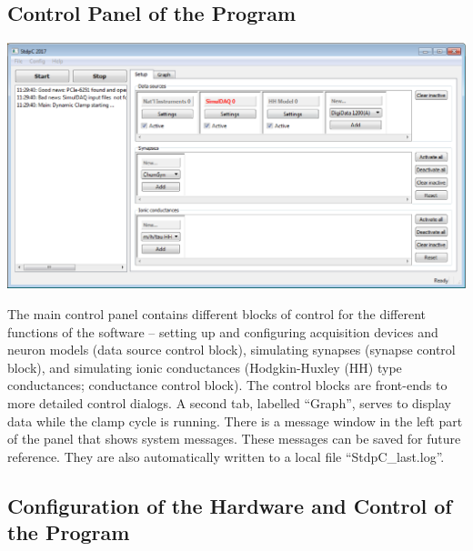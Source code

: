\documentclass{article}
\begin{document}
 
\subsection{Control Panel of the Program}

\parbox{\textwidth}{
  \includegraphics[width=\textwidth]{main}
}
\vspace*{0.5cm}

The main control panel contains different blocks of control for the
different functions of the software -- setting up and configuring acquisition
devices and neuron models (data source control block), simulating synapses
(synapse control block), and simulating ionic conductances (Hodgkin-Huxley (HH)
type conductances; conductance control block). The control blocks are front-ends to
more detailed control dialogs. A second tab, labelled ``Graph'', serves
to display data while the clamp cycle is running. There is a message window in the
left part of the panel that shows system messages. These messages can
be saved for future reference. They are also automatically written to
a local file ``StdpC\_last.log''.


\subsection{Configuration of the Hardware and Control of the Program}
\end{document}
